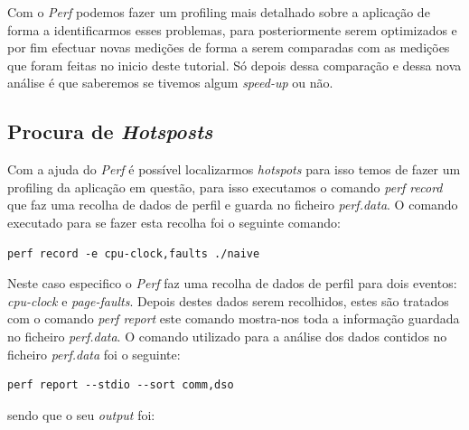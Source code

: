 \documentclass[conference,compsoc]{IEEEtran}
\begin{document}
Com o \textit{Perf} podemos fazer um profiling mais detalhado sobre a aplicação de forma a identificarmos esses problemas, para posteriormente serem optimizados e por fim efectuar novas medições de forma a serem comparadas com as medições que foram feitas no inicio deste tutorial. Só depois dessa comparação e dessa nova análise é que saberemos se tivemos algum \textit{speed-up} ou não.

\subsection{Procura de \textit{Hotsposts}}

Com a ajuda do \textit{Perf} é possível localizarmos \textit{hotspots} para isso temos de fazer um profiling da aplicação em questão, para isso executamos o comando \textit{perf record} que faz uma recolha de dados de perfil e guarda no ficheiro \textit{perf.data}. O comando executado para se fazer esta recolha foi o seguinte comando:

\begin{lstlisting}
perf record -e cpu-clock,faults ./naive
\end{lstlisting}

Neste caso especifico o \textit{Perf} faz uma recolha de dados de perfil para dois eventos: \textit{cpu-clock} e \textit{page-faults}. Depois destes dados serem recolhidos, estes são tratados com o comando \textit{perf report} este comando mostra-nos toda a informação guardada no ficheiro \textit{perf.data}. O comando utilizado para a análise dos dados contidos no ficheiro \textit{perf.data} foi o seguinte:

\begin{lstlisting}
perf report --stdio --sort comm,dso
\end{lstlisting}

sendo que o seu \textit{output} foi:
\end{document}
